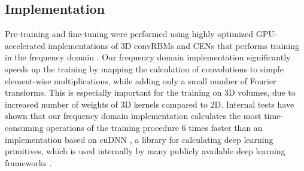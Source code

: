 
\subsection{Implementation}

Pre-training and fine-tuning were performed using highly optimized
GPU-accelerated implementations of 3D convRBMs and CENs that performs training
in the frequency domain \cite{brosch2014efficient}. Our frequency domain
implementation significantly speeds up the training by mapping the calculation
of convolutions to simple element-wise multiplications, while adding only a
small number of Fourier transforms. This is especially important for the
training on 3D volumes, due to increased number of weights of 3D kernels
compared to 2D. Internal tests have shown that our frequency domain
implementation calculates the most time-consuming operations of the training
procedure 6 times faster than an implementation based on cuDNN
\cite{chetlur2014}, a library for calculating deep learning primitives, which is
used internally by many publicly available deep learning frameworks
\cite{jia2014,Bastien2012,collobert2011torch7}.
